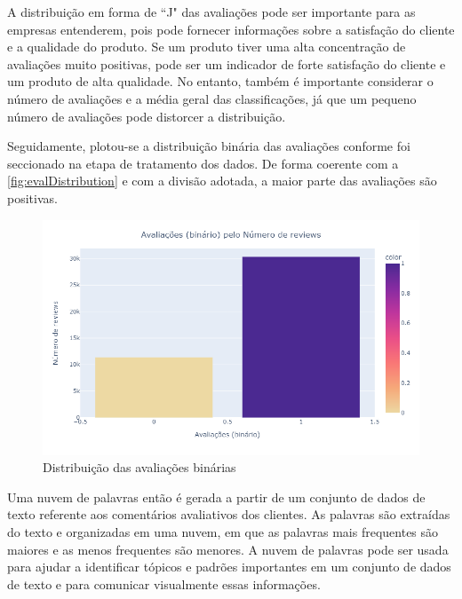 A distribuição em forma de ``J" das avaliações pode ser importante para as empresas entenderem, pois pode fornecer informações sobre a satisfação do cliente e a qualidade do produto. Se um produto tiver uma alta concentração de avaliações muito positivas, pode ser um indicador de forte satisfação do cliente e um produto de alta qualidade. No entanto, também é importante considerar o número de avaliações e a média geral das classificações, já que um pequeno número de avaliações pode distorcer a distribuição.

Seguidamente, plotou-se a distribuição binária das avaliações conforme foi seccionado na etapa de tratamento dos dados. De forma coerente com a \autoref{fig:evalDistribution} e com a divisão adotada, a maior parte das avaliações são positivas.

\begin{figure}[H]
    \centering
    \includegraphics[trim={0cm 2cm 3cm 2cm},clip,scale=0.6]{./figs/bin_eval.png}
    \caption{Distribuição das avaliações binárias}
    \label{fig:binEvalDistribution}
\end{figure}

Uma nuvem de palavras então é gerada a partir de um conjunto de dados de texto referente aos comentários avaliativos dos clientes. As palavras são extraídas do texto e organizadas em uma nuvem, em que as palavras mais frequentes são maiores e as menos frequentes são menores. A nuvem de palavras pode ser usada para ajudar a identificar tópicos e padrões importantes em um conjunto de dados de texto e para comunicar visualmente essas informações.

